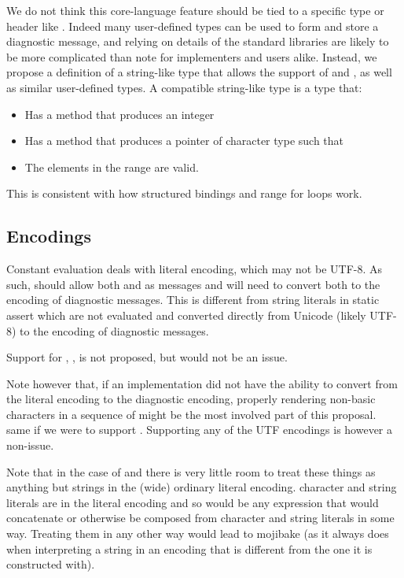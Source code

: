 \documentclass{wg21}
\begin{document}
We do not think this core-language feature should be tied to a specific type or header like .
Indeed many user-defined types can be used to form and store a diagnostic message, and relying on details of the standard libraries are likely to be more complicated than note for
implementers and users alike.
Instead, we propose a definition of a string-like type that allows the support of  and , as well as similar user-defined types.
A compatible string-like type is a type that:
\begin{itemize}
 \item Has a  method that produces an integer
 \item Has a  method that produces a pointer of character type such that
 \item The elements in the range \tcode{[data(), data()+size())} are valid.
\end{itemize}

This is consistent with how structured bindings and range for loops work.

\subsection{Encodings}

Constant evaluation deals with literal encoding, which may not be UTF-8.
As such,  should allow both  and  as messages and will need to convert both to the encoding of diagnostic messages.
This is different from string literals in static assert which are not evaluated and converted directly from Unicode (likely UTF-8) to the encoding of diagnostic messages.

Support for , ,  is not proposed, but would not be an issue.

Note however that, if an implementation did not have the ability to convert from the literal encoding to the diagnostic encoding,
properly rendering non-basic characters in a sequence of  might be the most involved part of this proposal. same if we were to support .
Supporting any of the UTF encodings is however a non-issue.

Note that in the case of  and  there is very little room to treat these things as anything but strings in the (wide) ordinary literal encoding.
character and string literals are in the literal encoding and so would be any expression that would concatenate or otherwise be composed from
character and string literals in some way.
Treating them in any other way would lead to mojibake (as it always does when interpreting a string in an encoding that is different from the one it is constructed with).
\end{document}
